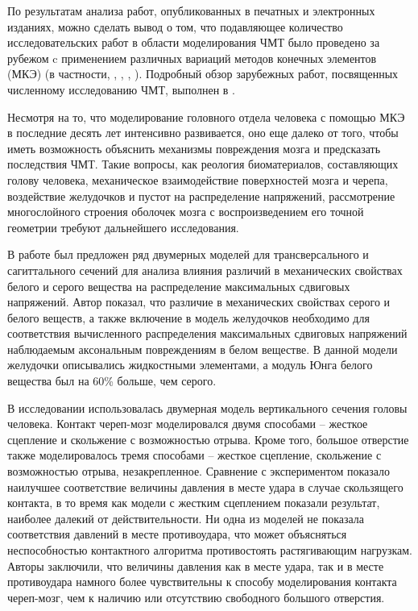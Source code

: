 По результатам анализа работ, опубликованных в печатных и электронных изданиях, можно сделать вывод о том, что подавляющее количество исследовательских работ в области моделирования ЧМТ было проведено за рубежом c применением различных вариаций методов конечных элементов (МКЭ) (в частности, \cite{zhou}, \cite{kuijpers}, \cite{chu}, \cite{claessens}). Подробный обзор зарубежных работ, посвященных численному исследованию ЧМТ, выполнен в \cite{agapov_diser}.

Несмотря на то, что моделирование головного отдела человека с помощью МКЭ в последние десять лет интенсивно развивается, оно еще далеко от того, чтобы иметь возможность объяснить механизмы повреждения мозга и предсказать последствия ЧМТ. Такие вопросы, как реология биоматериалов, составляющих голову человека, механическое взаимодействие поверхностей мозга и черепа, воздействие желудочков и пустот на распределение напряжений, рассмотрение многослойного строения оболочек мозга с воспроизведением его точной геометрии требуют дальнейшего исследования. 

В работе \cite{zhou} был предложен ряд двумерных моделей для трансверсального и сагиттального сечений для анализа влияния различий в механических свойствах белого и серого вещества на распределение максимальных сдвиговых напряжений. Автор показал, что различие в механических свойствах серого и белого веществ, а также включение в модель желудочков необходимо для соответствия вычисленного распределения максимальных сдвиговых напряжений наблюдаемым аксональным повреждениям в белом веществе. В данной модели желудочки описывались жидкостными элементами, а модуль Юнга белого вещества был на 60\% больше, чем серого. 

В исследовании \cite{kuijpers} использовалась двумерная модель вертикального сечения головы человека. Контакт череп-мозг моделировался двумя способами -- жесткое сцепление и скольжение с возможностью отрыва. Кроме того, большое отверстие также моделировалось тремя способами -- жесткое сцепление, скольжение с возможностью отрыва, незакрепленное. Сравнение с экспериментом показало наилучшее соответствие величины давления в месте удара в случае скользящего контакта, в то время как модели с жестким сцеплением показали результат, наиболее далекий от действительности. Ни одна из моделей не показала соответствия давлений в месте противоудара, что может объясняться неспособностью контактного алгоритма противостоять растягивающим нагрузкам. Авторы заключили, что величины давления как в месте удара, так и в месте противоудара намного более чувствительны к способу моделирования контакта череп-мозг, чем к наличию или отсутствию свободного большого отверстия. 

